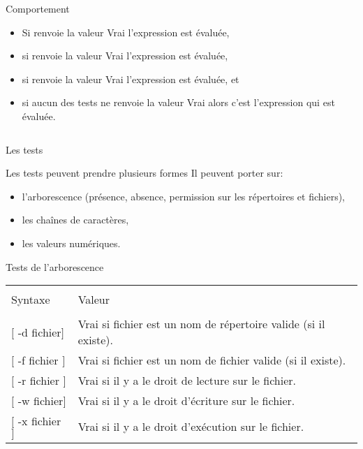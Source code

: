 \begin{frame}{}
\begin{columns}
		\begin{column}{5cm}
			\begin{block}{Comportement}
				\begin{itemize}
					\item Si  renvoie la valeur Vrai l'expression  est évaluée,\\
					\item si  renvoie la valeur Vrai l'expression  est évaluée,\\
					\item si  renvoie la valeur Vrai l'expression  est évaluée, et\\
					\item si aucun des tests ne renvoie la valeur Vrai alors c'est l'expression  qui est évaluée.
				\end{itemize}
			\end{block}
		\end{column}
	\end{columns}
\end{frame}
\begin{frame}{Les tests}
	\begin{block}{Les tests peuvent prendre plusieurs formes}
	Il peuvent porter sur:
		\begin{itemize}
			\item l'arborescence (présence, absence, permission sur les répertoires et fichiers),
			\item les chaînes de caractères,
			\item les valeurs numériques.
		\end{itemize}
	\end{block}
	\begin{block}{Tests de l'arborescence}
		\begin{center}
			\begin{tabular}{ll}
				\hline\\
				Syntaxe&Valeur\\
				\hline\\
				$[$ -d fichier$]$&Vrai si fichier est un nom de répertoire valide (si il existe).\\[3pt]
				$[$ -f fichier $]$&Vrai si fichier est un nom de fichier valide (si il existe).\\[3pt]
				$[$ -r fichier $]$&Vrai si il y a le droit de lecture sur le fichier.\\[3pt]
				$[$ -w fichier$]$&Vrai si il y a le droit d'écriture sur le fichier.\\[3pt]
				$[$ -x fichier $]$&Vrai si il y a le droit d'exécution sur le fichier.\\[3pt]
				\hline
			\end{tabular}
		\end{center}
	\end{block}
\end{frame}
